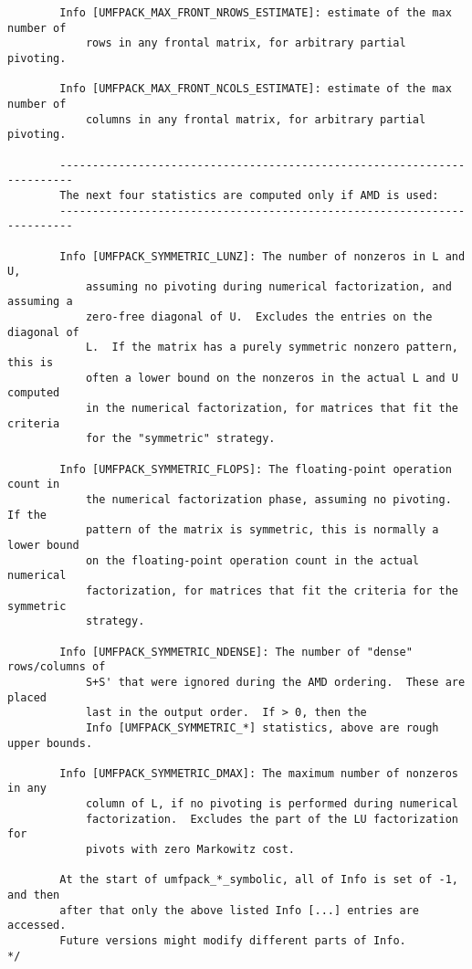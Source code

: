 \documentclass[11pt]{article}
\begin{document}
{\begin{verbatim}
        Info [UMFPACK_MAX_FRONT_NROWS_ESTIMATE]: estimate of the max number of
            rows in any frontal matrix, for arbitrary partial pivoting.

        Info [UMFPACK_MAX_FRONT_NCOLS_ESTIMATE]: estimate of the max number of
            columns in any frontal matrix, for arbitrary partial pivoting.

        ------------------------------------------------------------------------
        The next four statistics are computed only if AMD is used:
        ------------------------------------------------------------------------

        Info [UMFPACK_SYMMETRIC_LUNZ]: The number of nonzeros in L and U,
            assuming no pivoting during numerical factorization, and assuming a
            zero-free diagonal of U.  Excludes the entries on the diagonal of
            L.  If the matrix has a purely symmetric nonzero pattern, this is
            often a lower bound on the nonzeros in the actual L and U computed
            in the numerical factorization, for matrices that fit the criteria
            for the "symmetric" strategy.

        Info [UMFPACK_SYMMETRIC_FLOPS]: The floating-point operation count in
            the numerical factorization phase, assuming no pivoting.  If the
            pattern of the matrix is symmetric, this is normally a lower bound
            on the floating-point operation count in the actual numerical
            factorization, for matrices that fit the criteria for the symmetric
            strategy.

        Info [UMFPACK_SYMMETRIC_NDENSE]: The number of "dense" rows/columns of
            S+S' that were ignored during the AMD ordering.  These are placed
            last in the output order.  If > 0, then the
            Info [UMFPACK_SYMMETRIC_*] statistics, above are rough upper bounds.

        Info [UMFPACK_SYMMETRIC_DMAX]: The maximum number of nonzeros in any
            column of L, if no pivoting is performed during numerical
            factorization.  Excludes the part of the LU factorization for
            pivots with zero Markowitz cost.

        At the start of umfpack_*_symbolic, all of Info is set of -1, and then
        after that only the above listed Info [...] entries are accessed.
        Future versions might modify different parts of Info.
*/

\end{verbatim}
}
\end{document}
